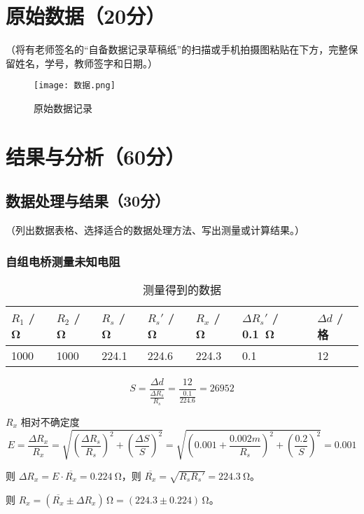 \documentclass{../template/Report}%
\begin{document}
\begin{fullreportonly}
\section{原始数据（20分）}
（将有老师签名的“自备数据记录草稿纸”的扫描或手机拍摄图粘贴在下方，完整保留姓名，学号，教师签字和日期。）
\begin{figure}[H]
    \centering
    \texttt{[image: 数据.png]}
    \caption{原始数据记录}
    \label{fig:原始数据}
\end{figure}
\section{结果与分析（60分）}
\subsection{数据处理与结果（30分）}
（列出数据表格、选择适合的数据处理方法、写出测量或计算结果。）
\subsubsection{自组电桥测量未知电阻}
\begin{table}[H]
    \centering %
    \caption{测量得到的数据}
    \begin{tabular}{|C{0.08\textwidth}|C{0.08\textwidth}|C{0.08\textwidth}|C{0.08\textwidth}|C{0.08\textwidth}|C{0.08\textwidth}|C{0.08\textwidth}|}
        \hline
        $R_1$ / \si{\ohm} & $R_2$ / \si{\ohm} & $R_s$ / \si{\ohm} & $R_s'$ / \si{\ohm} & $R_x$ / \si{\ohm} & $\Delta R_s'$ / \SI{0.1}{\ohm} & $\Delta d$ / 格 \\
        \hline
        1000 & 1000 & 224.1 & 224.6 & 224.3 & 0.1 & 12 \\
        \hline
    \end{tabular}
\end{table}
\[
    S = \frac{\Delta d}{\frac{\Delta R_s}{R_s}} = \frac{12}{\frac{0.1}{224.6}} = 26952
\]

$R_x$ 相对不确定度
\[
    E = \frac{\Delta R_x}{R_x} = \sqrt{\left(\frac{\Delta R_s}{R_s}\right)^2 + \left(\frac{\Delta S}{S}\right)^2} = \sqrt{\left(0.001 + \frac{0.002m}{R_s}\right)^2 + \left(\frac{0.2}{S}\right)^2} = 0.001
\]

则 $\Delta R_x = E \cdot \overline{R_x} = \SI{0.224}{\ohm}$，则 $\overline{R_x} = \sqrt{R_s R_s'} = \SI{224.3}{\ohm}$。

则 $R_x = (\overline{R_x} \pm \Delta R_x)\,\si{\ohm} = (224.3 \pm 0.224)\,\si{\ohm}$。

\end{fullreportonly}
\end{document}
